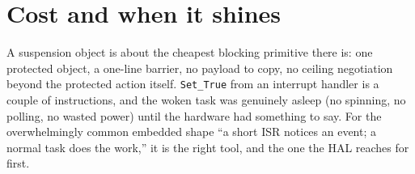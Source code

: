 \section{Cost and when it shines}

A suspension object is about the cheapest blocking primitive there is: one protected
object, a one-line barrier, no payload to copy, no ceiling negotiation beyond the
protected action itself. \texttt{Set\_True} from an interrupt handler is a couple of
instructions, and the woken task was genuinely asleep (no spinning, no polling,
no wasted power) until the hardware had something to say. For the overwhelmingly
common embedded shape ``a short ISR notices an event; a normal task does the work,''
it is the right tool, and the one the HAL reaches for first.
